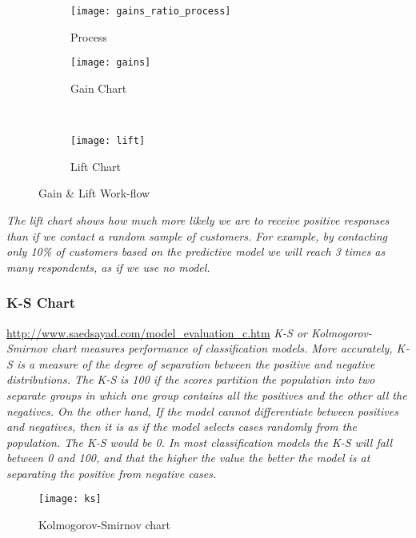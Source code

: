 \begin{figure}[H]
	\centering
	\begin{subfigure}[b]{0.90\textwidth}
		\captionsetup{font=scriptsize}
		\texttt{[image: gains\_ratio\_process]}\caption{Process}\label{fig:gains_ratio_process}
	\end{subfigure} 
	\medskip
	\newline
	\begin{subfigure}[b]{0.45\textwidth}
		\captionsetup{font=scriptsize}
		\texttt{[image: gains]}
		\caption{Gain Chart}\label{fig:gains}
	\end{subfigure} ~\quad
	\begin{subfigure}[b]{0.45\textwidth}
		\captionsetup{font=scriptsize}
		\texttt{[image: lift]}
		\caption{Lift Chart}\label{fig:lift}
	\end{subfigure}
	\caption{Gain \& Lift Work-flow}
	\label{fig:unbal_corr_analysis}
\end{figure}

\textit{The lift chart shows how much more likely we are to receive positive responses than if we contact a random sample of customers. For example, by contacting only 10\% of customers based on the predictive model we will reach 3 times as many respondents, as if we use no model.}

\subsubsection{K-S Chart}
\url{http://www.saedsayad.com/model_evaluation_c.htm}
\textit{K-S or Kolmogorov-Smirnov chart measures performance of classification models. More accurately, K-S is a measure of the degree of separation between the positive and negative distributions. The K-S is 100 if the scores partition the population into two separate groups in which one group contains all the positives and the other all the negatives. On the other hand, If the model cannot differentiate between positives and negatives, then it is as if the model selects cases randomly from the population. The K-S would be 0. In most classification models the K-S will fall between 0 and 100, and that the higher the value the better the model is at separating the positive from negative cases.}

\begin{figure}[H]
	\texttt{[image: ks]}
	\caption[Kolmogorov-Smirnov chart ]
	{Kolmogorov-Smirnov chart }
	\label{fig:ks}
\end{figure}



